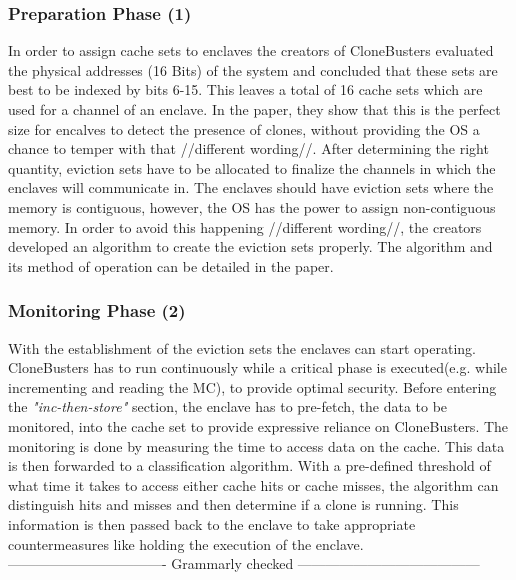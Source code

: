 \subsubsection{Preparation Phase (1)}
In order to assign cache sets to enclaves the creators of CloneBusters evaluated the physical addresses (16 Bits) of the system and concluded that these sets are best to be indexed by bits 6-15. This leaves a total of 16 cache sets which are used for a channel of an enclave. In the paper, they show that this is the perfect size for encalves to detect the presence of clones, without providing the OS a chance to temper with that //different wording//. 
After determining the right quantity, eviction sets have to be allocated to finalize the channels in which the enclaves will communicate in. The enclaves should have eviction sets where the memory is contiguous, however, the OS has the power to assign non-contiguous memory. In order to avoid this happening //different wording//, the creators developed an algorithm to create the eviction sets properly. The algorithm and its method of operation can be detailed in the paper.

\subsubsection{Monitoring Phase (2)}
With the establishment of the eviction sets the enclaves can start operating. CloneBusters has to run continuously while a critical phase is executed(e.g. while incrementing and reading the MC), to provide optimal security. Before entering the \textit{"inc-then-store"} section, the enclave has to pre-fetch, the data to be monitored, into the cache set to provide expressive reliance on CloneBusters. 
The monitoring is done by measuring the time to access data on the cache. This data is then forwarded to a classification algorithm. With a pre-defined threshold of what time it takes to access either cache hits or cache misses, the algorithm can distinguish hits and misses and then determine if a clone is running. This information is then passed back to the enclave to take appropriate countermeasures like holding the execution of the enclave.\\
---------------------------------- Grammarly checked ---------------------------------------